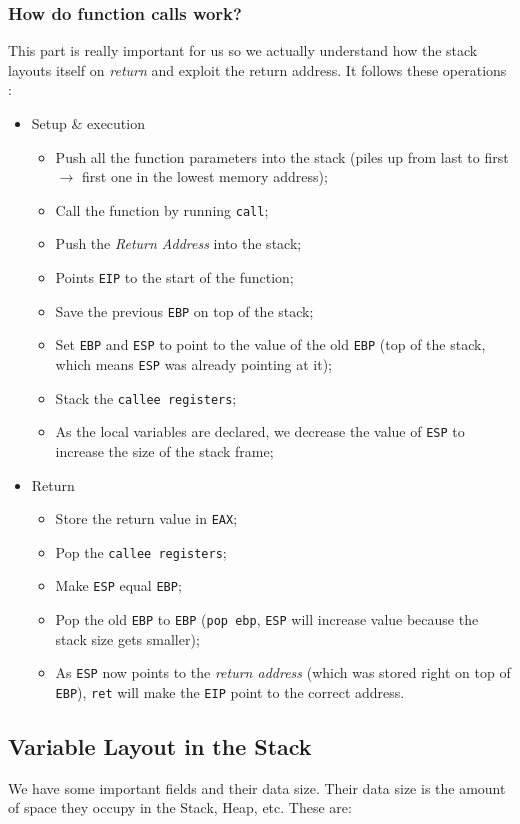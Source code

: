 \documentclass[11pt]{article}
\begin{document}
\subsubsection{How do function calls work?}
\label{sec:orgadda1df}
This part is really important for us so we actually understand how the stack layouts itself on \emph{return} and exploit the return address. It follows these operations \cite{functionCall}:

\begin{itemize}
\item Setup \& execution
\begin{itemize}
\item Push all the function parameters into the stack (piles up from last to first \(\to\) first one in the lowest memory address);
\item Call the function by running \texttt{call};
\item Push the \emph{Return Address} into the stack;
\item Points \texttt{EIP} to the start of the function;
\item Save the previous \texttt{EBP} on top of the stack;
\item Set \texttt{EBP} and \texttt{ESP} to point to the value of the old \texttt{EBP} (top of the stack, which means \texttt{ESP} was already pointing at it);
\item Stack the \texttt{callee registers};
\item As the local variables are declared, we decrease the value of \texttt{ESP} to increase the size of the stack frame;
\end{itemize}
\item Return 
\begin{itemize}
\item Store the return value in \texttt{EAX};
\item Pop the \texttt{callee registers};
\item Make \texttt{ESP} equal \texttt{EBP};
\item Pop the old \texttt{EBP} to \texttt{EBP} (\texttt{pop ebp}, \texttt{ESP} will increase value because the stack size gets smaller);
\item As \texttt{ESP} now points to the \emph{return address} (which was stored right on top of \texttt{EBP}), \texttt{ret} will make the \texttt{EIP} point to the correct address.
\end{itemize}
\end{itemize}

\subsection{Variable Layout in the Stack}
\label{sec:orgfd734bc}
\label{sec:VarLayoutStack}
We have some important fields and their data size. Their data size is the amount of space they occupy in the Stack, Heap, etc. These are:
\end{document}
